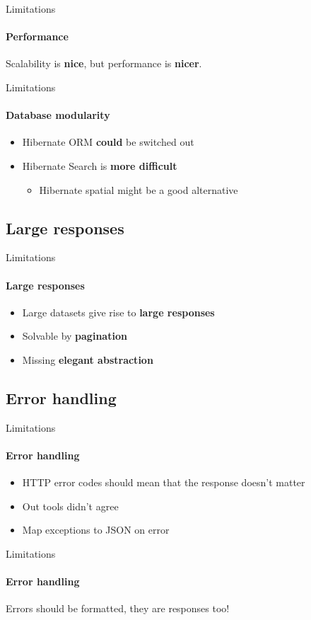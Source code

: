 \begin{frame}{Limitations}
	\framesubtitle{Performance}
	Scalability is \textbf{nice}, but performance is \textbf{nicer}.
\end{frame}

\begin{frame}{Limitations}
	\framesubtitle{Database modularity}
	\begin{itemize}
		\item Hibernate ORM \textbf{could} be switched out
		\item Hibernate Search is \textbf{more difficult}
			\begin{itemize}
				\item Hibernate spatial might be a good alternative
			\end{itemize}
	\end{itemize}
\end{frame}

\subsection{Large responses}
\begin{frame}{Limitations}
	\framesubtitle{Large responses}
	\begin{itemize}
		\item Large datasets give rise to \textbf{large responses}
		\item Solvable by \textbf{pagination}
		\item Missing \textbf{elegant abstraction}
	\end{itemize}
\end{frame}

\subsection{Error handling}
\begin{frame}{Limitations}
	\framesubtitle{Error handling}
	\begin{itemize}
		\item HTTP error codes should mean that the response doesn't matter
		\item Out tools didn't agree
		\item Map exceptions to JSON on error
	\end{itemize}
\end{frame}

\begin{frame}{Limitations}
	\framesubtitle{Error handling}
	Errors should be formatted, they are responses too!
\end{frame}

